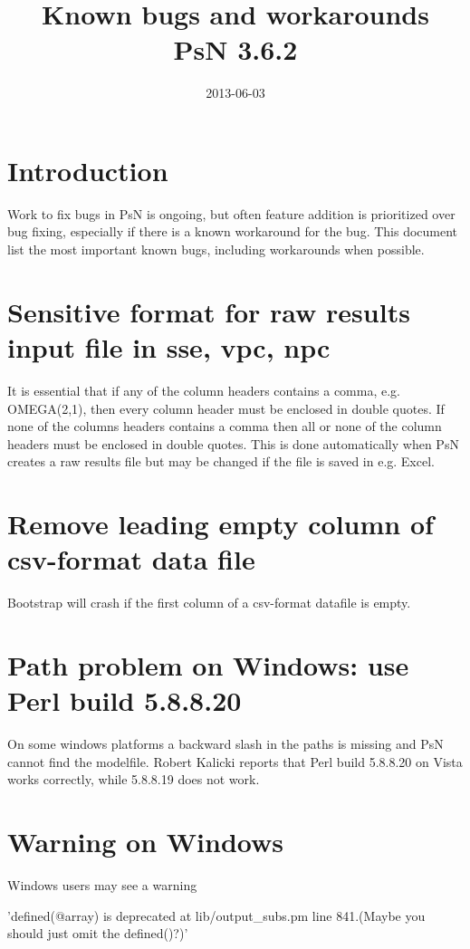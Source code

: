 \documentclass[a4paper,12pt]{article}
\title{Known bugs and workarounds\\ \vspace{2 mm} {\large PsN 3.6.2}}
\date{2013-06-03}
\begin{document}
\maketitle


\section{Introduction}
Work to fix bugs in PsN is ongoing, but often feature addition is prioritized over bug fixing, especially if there is a known workaround for the bug. This document list the most important known bugs, including workarounds when possible.   

\section{Sensitive format for raw results input file in sse, vpc, npc}

It is essential that if any of the column headers contains a comma, e.g. OMEGA(2,1), then every column header must be enclosed in double quotes. If none of the columns headers contains a comma then all or none of the column headers must be enclosed in double quotes. This is done automatically when PsN creates a raw results file but may be changed if the file is saved in e.g. Excel.


\section{Remove leading empty column of csv-format data file}

Bootstrap will crash if the first column of a csv-format datafile is empty.

\section{Path problem on Windows: use Perl build 5.8.8.20}

On some windows platforms a backward slash in the paths is missing and PsN cannot find the modelfile. Robert Kalicki reports that Perl build 5.8.8.20 on Vista works correctly, while 5.8.8.19 does not work.

\section{Warning on Windows}

Windows users may see a warning 

'defined(@array) is deprecated at lib/output\_subs.pm line 841.(Maybe you should just omit the defined()?)' 
\end{document}
